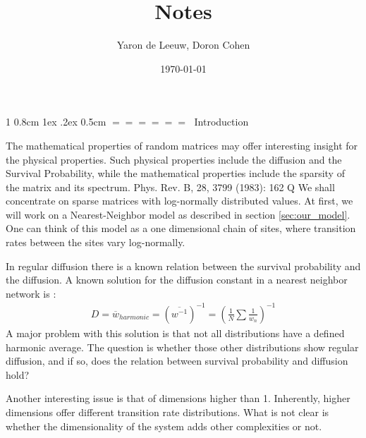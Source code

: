 \documentclass[onecolumn,fleqn,notitlepage,secnumarabic]{revtex4}
\makeatletter
\def\section{%
  \@startsection
    {section}%
    {1}%
    {\z@}%
    {0.8cm \@plus1ex \@minus .2ex}%
    {0.5cm}%
    {\Large\bf $=\!=\!=\!=\!=\!=\;$}%
}%
\makeatother
\begin{document}
\title{Notes}

\author{Yaron de Leeuw, Doron Cohen}
\date{\today}
\maketitle



\section{Introduction}

The mathematical properties of random matrices may offer interesting insight for the physical properties. Such physical properties include the diffusion and the Survival Probability, while the mathematical properties include the sparsity of the matrix and its spectrum. 
Phys. Rev. B, 28, 3799 (1983): 162 Q
We shall concentrate on sparse matrices with log-normally distributed values. At first, we will work on a Nearest-Neighbor model as described in section \ref{sec:our_model}. One can think of this model as a one dimensional chain of sites, where transition rates between the sites vary log-normally.

In regular diffusion there is a known relation between the survival probability and the diffusion. 
A known solution for the diffusion constant in a nearest neighbor network is \cite{Derrida:1983}:
\begin{align}
D=\overline{w}_{harmonic} =(\overline{w^{-1}})^{-1}=\left(\frac{1}{N}\sum\frac{1}{w_n}\right)^{-1}
\end{align}
A major problem with this solution is that not all distributions have a defined harmonic average. The question is whether those other distributions show regular diffusion, and if so, does the relation between survival probability and diffusion hold?


Another interesting issue is that of dimensions higher than 1. Inherently, higher dimensions offer different transition rate distributions. What is not clear is whether the dimensionality of the system adds other complexities or not. 
\end{document}
